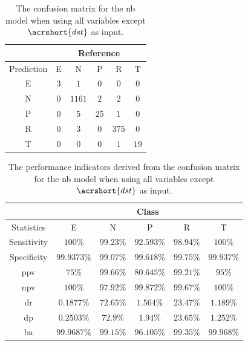 \documentclass[sn-mathphys-num]{sn-jnl}%
\begin{document}
\begin{table}[!ht]
    \centering
    \caption{The confusion matrix for the \acrlong{nb} model when using all variables except $\acrshort{dst}$ as input.}
	\label{tab:cm:no_DisturbanceStormTime:nb}
	\begin{tabular}{|c|c|c|c|c|c|}
		\hline
		 & \multicolumn{5}{|c|}{Reference} \\ \hline
		 Prediction & E & N & P & R & T \\ \hline
		 E & $3$ & $1$ & $0$ & $0$ & $0$ \\ \hline
		 N & $0$ & $1161$ & $2$ & $2$ & $0$ \\ \hline
		 P & $0$ & $5$ & $25$ & $1$ & $0$ \\ \hline
		 R & $0$ & $3$ & $0$ & $375$ & $0$ \\ \hline
		 T & $0$ & $0$ & $0$ & $1$ & $19$ \\ \hline
	\end{tabular}
\end{table}

\begin{table}[!ht]
    \centering
    \caption{The performance indicators derived from the confusion matrix for the \acrlong{nb} model when using all variables except $\acrshort{dst}$ as input.}
	\label{tab:cs:reverse:no_DisturbanceStormTime:nb}
	\begin{tabular}{|c|c|c|c|c|c|}
		\hline
		 & \multicolumn{5}{c|}{Class} \\ \hline
		Statistics & E & N & P & R & T \\ \hline
		Sensitivity & $100\%$ & $99.23\%$ & $92.593\%$ & $98.94\%$ & $100\%$ \\ \hline
		Specificity & $99.9373\%$ & $99.07\%$ & $99.618\%$ & $99.75\%$ & $99.937\%$ \\ \hline
		\acrshort{ppv} & $75\%$ & $99.66\%$ & $80.645\%$ & $99.21\%$ & $95\%$ \\ \hline
		\acrshort{npv} & $100\%$ & $97.92\%$ & $99.872\%$ & $99.67\%$ & $100\%$ \\ \hline
		\acrshort{dr} & $0.1877\%$ & $72.65\%$ & $1.564\%$ & $23.47\%$ & $1.189\%$ \\ \hline
		\acrshort{dp} & $0.2503\%$ & $72.9\%$ & $1.94\%$ & $23.65\%$ & $1.252\%$ \\ \hline
		\acrshort{ba} & $99.9687\%$ & $99.15\%$ & $96.105\%$ & $99.35\%$ & $99.968\%$ \\ \hline
	\end{tabular}
\end{table}
\end{document}
